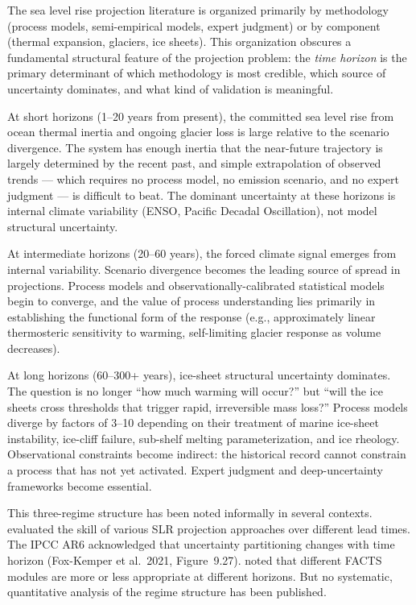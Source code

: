 \documentclass[11pt]{article}
\begin{document}
The sea level rise projection literature is organized primarily by methodology (process models, semi-empirical models, expert judgment) or by component (thermal expansion, glaciers, ice sheets).  This organization obscures a fundamental structural feature of the projection problem: the \emph{time horizon} is the primary determinant of which methodology is most credible, which source of uncertainty dominates, and what kind of validation is meaningful.

At short horizons (1--20 years from present), the committed sea level rise from ocean thermal inertia and ongoing glacier loss is large relative to the scenario divergence.  The system has enough inertia that the near-future trajectory is largely determined by the recent past, and simple extrapolation of observed trends --- which requires no process model, no emission scenario, and no expert judgment --- is difficult to beat.  The dominant uncertainty at these horizons is internal climate variability (ENSO, Pacific Decadal Oscillation), not model structural uncertainty.

At intermediate horizons (20--60 years), the forced climate signal emerges from internal variability.  Scenario divergence becomes the leading source of spread in projections.  Process models and observationally-calibrated statistical models begin to converge, and the value of process understanding lies primarily in establishing the functional form of the response (e.g., approximately linear thermosteric sensitivity to warming, self-limiting glacier response as volume decreases).

At long horizons (60--300+ years), ice-sheet structural uncertainty dominates.  The question is no longer ``how much warming will occur?'' but ``will the ice sheets cross thresholds that trigger rapid, irreversible mass loss?''  Process models diverge by factors of 3--10 depending on their treatment of marine ice-sheet instability, ice-cliff failure, sub-shelf melting parameterization, and ice rheology.  Observational constraints become indirect: the historical record cannot constrain a process that has not yet activated.  Expert judgment and deep-uncertainty frameworks become essential.

This three-regime structure has been noted informally in several contexts.  \citet{slangen2023evaluating} evaluated the skill of various SLR projection approaches over different lead times. The IPCC AR6 acknowledged that uncertainty partitioning changes with time horizon (Fox-Kemper et al.\ 2021, Figure~9.27).  \citet{kopp2023facts} noted that different FACTS modules are more or less appropriate at different horizons.  But no systematic, quantitative analysis of the regime structure has been published.
\end{document}

